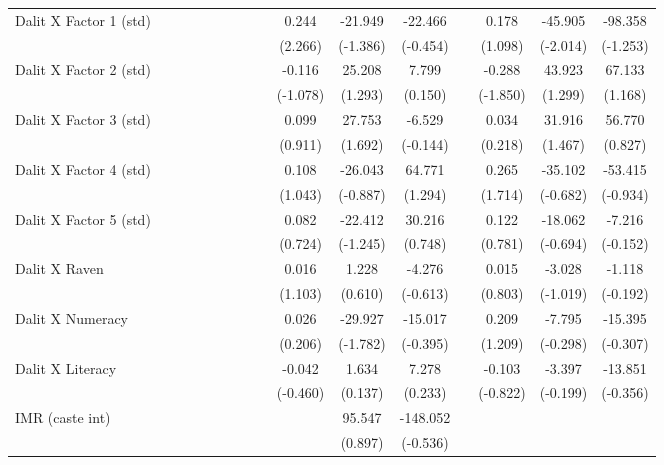 {\begin{longtable}{@{\extracolsep{\fill}}lccccccccccccccc}
    Dalit X Factor 1 (std) &   &   &   &   &   &   &   &   & 0.244 & -21.949 & -22.466 &   & 0.178 & -45.905 & -98.358 \\
      &   &   &   &   &   &   &   &   & (2.266) & (-1.386) & (-0.454) &   & (1.098) & (-2.014) & (-1.253) \\
    Dalit X Factor 2 (std) &   &   &   &   &   &   &   &   & -0.116 & 25.208 & 7.799 &   & -0.288 & 43.923 & 67.133 \\
      &   &   &   &   &   &   &   &   & (-1.078) & (1.293) & (0.150) &   & (-1.850) & (1.299) & (1.168) \\
    Dalit X Factor 3 (std) &   &   &   &   &   &   &   &   & 0.099 & 27.753 & -6.529 &   & 0.034 & 31.916 & 56.770 \\
      &   &   &   &   &   &   &   &   & (0.911) & (1.692) & (-0.144) &   & (0.218) & (1.467) & (0.827) \\
    Dalit X Factor 4 (std) &   &   &   &   &   &   &   &   & 0.108 & -26.043 & 64.771 &   & 0.265 & -35.102 & -53.415 \\
      &   &   &   &   &   &   &   &   & (1.043) & (-0.887) & (1.294) &   & (1.714) & (-0.682) & (-0.934) \\
    Dalit X Factor 5 (std) &   &   &   &   &   &   &   &   & 0.082 & -22.412 & 30.216 &   & 0.122 & -18.062 & -7.216 \\
      &   &   &   &   &   &   &   &   & (0.724) & (-1.245) & (0.748) &   & (0.781) & (-0.694) & (-0.152) \\
    Dalit X Raven &   &   &   &   &   &   &   &   & 0.016 & 1.228 & -4.276 &   & 0.015 & -3.028 & -1.118 \\
      &   &   &   &   &   &   &   &   & (1.103) & (0.610) & (-0.613) &   & (0.803) & (-1.019) & (-0.192) \\
    Dalit X Numeracy &   &   &   &   &   &   &   &   & 0.026 & -29.927 & -15.017 &   & 0.209 & -7.795 & -15.395 \\
      &   &   &   &   &   &   &   &   & (0.206) & (-1.782) & (-0.395) &   & (1.209) & (-0.298) & (-0.307) \\
    Dalit X Literacy &   &   &   &   &   &   &   &   & -0.042 & 1.634 & 7.278 &   & -0.103 & -3.397 & -13.851 \\
      &   &   &   &   &   &   &   &   & (-0.460) & (0.137) & (0.233) &   & (-0.822) & (-0.199) & (-0.356) \\
    IMR (caste int) &   &   &   &   &   &   &   &   &   & 95.547 & -148.052 &   &   &   &  \\
      &   &   &   &   &   &   &   &   &   & (0.897) & (-0.536) &   &   &   &  \\

\end{longtable}}
